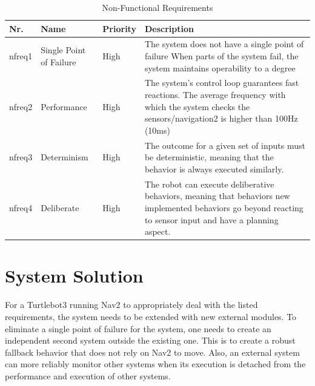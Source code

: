 \begin{table}[h!]
	\caption{Non-Functional Requirements}
	\begin{tabular}{ | m{} | m{}| m{} | m{} |} 
  	\hline
  	Nr. & Name & Priority & Description \\ 
  	\hline
  	nfreq1 & Single Point of Failure & High &  The system does not have a single point of failure	When parts of the system fail, the system maintains operability to a degree \\ 
  	\hline
  	nfreq2 & Performance & High & The system's control loop guarantees fast reactions. The average frequency with which the system checks the sensors/navigation2 is higher than 100Hz (10ms) \\ 
  	\hline
  	nfreq3 & Determinism & High & The outcome for a given set of inputs must be deterministic, meaning that the behavior is always executed similarly. \\
  	\hline
  	nfreq4 & Deliberate & High & The robot can execute deliberative behaviors, meaning that behaviors new implemented behaviors go beyond reacting to sensor input and have a planning aspect. \\
  	\hline
	\end{tabular}
\end{table}


\section{System Solution}

For a Turtlebot3 running Nav2 to appropriately deal with the listed requirements, the system needs to be extended with new external modules. To eliminate a single point of failure for the system, one needs to create an independent second system outside the existing one. This is to create a robust fallback behavior that does not rely on Nav2 to move. Also, an external system can more reliably monitor other systems when its execution is detached from the performance and execution of other systems. 

